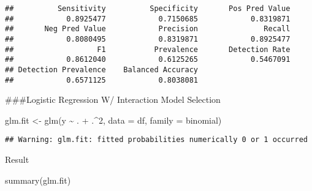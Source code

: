 \documentclass[
]{article}
\newenvironment{Shaded}{\begin{snugshade}}{\end{snugshade}}
\newcommand{\AttributeTok}[1]{\textcolor[rgb]{0.77,0.63,0.00}{#1}}
\newcommand{\DecValTok}[1]{\textcolor[rgb]{0.00,0.00,0.81}{#1}}
\newcommand{\FunctionTok}[1]{\textcolor[rgb]{0.00,0.00,0.00}{#1}}
\newcommand{\NormalTok}[1]{#1}
\newcommand{\OtherTok}[1]{\textcolor[rgb]{0.56,0.35,0.01}{#1}}
\newcommand{\SpecialCharTok}[1]{\textcolor[rgb]{0.00,0.00,0.00}{#1}}
\begin{document}
\begin{Shaded}
\end{Shaded}

\begin{verbatim}
##          Sensitivity          Specificity       Pos Pred Value 
##            0.8925477            0.7150685            0.8319871 
##       Neg Pred Value            Precision               Recall 
##            0.8080495            0.8319871            0.8925477 
##                   F1           Prevalence       Detection Rate 
##            0.8612040            0.6125265            0.5467091 
## Detection Prevalence    Balanced Accuracy 
##            0.6571125            0.8038081
\end{verbatim}

\#\#\#Logistic Regression W/ Interaction Model Selection

\begin{Shaded}
\begin{Highlighting}[]
\NormalTok{glm.fit }\OtherTok{\textless{}{-}} \FunctionTok{glm}\NormalTok{(y }\SpecialCharTok{\textasciitilde{}}\NormalTok{ . }\SpecialCharTok{+}\NormalTok{ .}\SpecialCharTok{\^{}}\DecValTok{2}\NormalTok{, }\AttributeTok{data =}\NormalTok{ df, }\AttributeTok{family =}\NormalTok{ binomial)}
\end{Highlighting}
\end{Shaded}

\begin{verbatim}
## Warning: glm.fit: fitted probabilities numerically 0 or 1 occurred
\end{verbatim}

Result

\begin{Shaded}
\begin{Highlighting}[]
\FunctionTok{summary}\NormalTok{(glm.fit)}
\end{Highlighting}
\end{Shaded}
\end{document}
